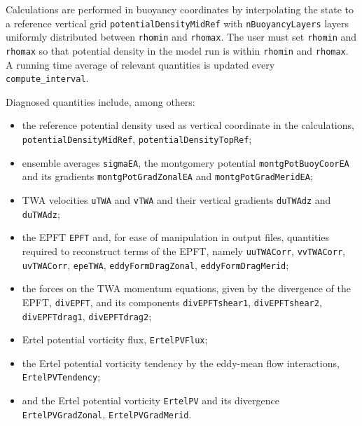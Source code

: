 Calculations are performed in buoyancy coordinates by interpolating the state to a reference vertical grid \verb+potentialDensityMidRef+ with \verb+nBuoyancyLayers+ layers uniformly distributed between \verb+rhomin+ and \verb+rhomax+. The user must set \verb+rhomin+ and \verb+rhomax+ so that potential density in the model run is within \verb+rhomin+ and \verb+rhomax+.
A running time average of relevant quantities is updated every \verb+compute_interval+.

Diagnosed quantities include, among others: 
\begin{itemize}
\item the reference potential density used as vertical coordinate in the calculations, \verb+potentialDensityMidRef+, \verb+potentialDensityTopRef+;
\item ensemble averages \verb+sigmaEA+, the montgomery potential \verb+montgPotBuoyCoorEA+ and its gradients \verb+montgPotGradZonalEA+ and \verb+montgPotGradMeridEA+; 
\item TWA velocities \verb+uTWA+ and \verb+vTWA+ and their vertical gradients \verb+duTWAdz+ and \verb+duTWAdz+; 
\item the EPFT \verb+EPFT+ and, for ease of manipulation in output files, quantities required to reconstruct terms of the EPFT, namely \verb+uuTWACorr+, \verb+vvTWACorr+, \verb+uvTWACorr+, \verb+epeTWA+, \verb+eddyFormDragZonal+, \verb+eddyFormDragMerid+;
\item the forces on the TWA momentum equations, given by the divergence of the EPFT, \verb+divEPFT+, and its components \verb+divEPFTshear1+, \verb+divEPFTshear2+, \verb+divEPFTdrag1+, \verb+divEPFTdrag2+;
\item Ertel potential vorticity flux, \verb+ErtelPVFlux+;
\item the Ertel potential vorticity tendency by the eddy-mean flow interactions, \verb+ErtelPVTendency+;
\item and the Ertel potential vorticity \verb+ErtelPV+ and its divergence \verb+ErtelPVGradZonal+, \verb+ErtelPVGradMerid+.
\end{itemize}